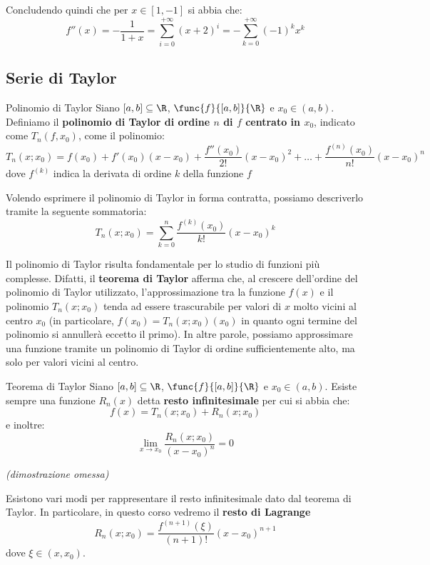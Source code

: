 \documentclass[a4paper, 12pt]{report}
\begin{document}
    Concludendo quindi che per $x \in [1, -1]$ si abbia che:
    \[f''(x) = - \frac{1}{1+x} = \sum_{i = 0}^{+\infty} (x+2)^{i} = -\sum_{k = 0}^{+\infty} (-1)^{k} x^k \]

    \subsection{Serie di Taylor}
    
    \begin{frameddefn}{Polinomio di Taylor}
        Siano $[a,b] \subseteq \R$, $\func{f}{[a,b]}{\R}$ e $x_0 \in (a,b)$. Definiamo il \textbf{polinomio di Taylor di ordine $n$ di $f$ centrato in $x_0$}, indicato come $T_n(f, x_0)$, come il polinomio:
        \[T_n(x;x_0) = f(x_0) + f'(x_0) (x-x_0) + \frac{f''(x_0)}{2!}(x-x_0)^2 + \ldots + \frac{f^{(n)}(x_0)}{n!} (x-x_0)^{n}\]
        dove $f^{(k)}$ indica la derivata di ordine $k$ della funzione $f$
    \end{frameddefn}

    Volendo esprimere il polinomio di Taylor in forma contratta, possiamo descriverlo tramite la seguente sommatoria:
    \[T_n(x;x_0) = \sum_{k = 0}^n \frac{f^{(k)}(x_0)}{k!} (x-x_0)^{k} \]
    
    Il polinomio di Taylor risulta fondamentale per lo studio di funzioni più complesse. Difatti, il \textbf{teorema di Taylor} afferma che, al crescere dell'ordine del polinomio di Taylor utilizzato, l'approssimazione tra la funzione $f(x)$ e il polinomio $T_n(x;x_0)$ tenda ad essere trascurabile per valori di $x$ molto vicini al centro $x_0$ (in particolare, $f(x_0) = T_n(x; x_0)(x_0)$ in quanto ogni termine del polinomio si annullerà eccetto il primo). In altre parole, possiamo approssimare una funzione tramite un polinomio di Taylor di ordine sufficientemente alto, ma solo per valori vicini al centro.

    \begin{framedthm}{Teorema di Taylor}
        Siano $[a,b] \subseteq \R$, $\func{f}{[a,b]}{\R}$ e $x_0 \in (a,b)$. Esiste sempre una funzione $R_n(x)$ detta \textbf{resto infinitesimale} per cui si abbia che:
        \[f(x) = T_n(x;x_0) + R_n(x; x_0)\]
        e inoltre:
        \[\lim_{x \to x_0} \frac{R_n(x; x_0)}{(x-x_0)^n} = 0\]

        \textit{(dimostrazione omessa)}
    \end{framedthm}

    Esistono vari modi per rappresentare il resto infinitesimale dato dal teorema di Taylor. In particolare, in questo corso vedremo il \textbf{resto di Lagrange}
    \[R_n(x; x_0) = \frac{f^{(n+1)}(\xi)}{(n+1)!} (x-x_0)^{n+1}\]
    dove $\xi \in (x, x_0)$.
\end{document}
